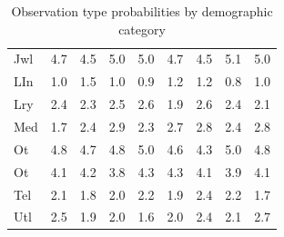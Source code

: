 \documentclass[12pt]{article}
\begin{document}
\begin{table}[!ht]
{\begin{tabular}{lllllllll}
        Jwl & 4.7 & 4.5 & 5.0 & 5.0 & 4.7 & 4.5 & 5.1 & 5.0\\
        LIn & 1.0 & 1.5 & 1.0 & 0.9 & 1.2 & 1.2 & 0.8 & 1.0\\
        Lry & 2.4 & 2.3 & 2.5 & 2.6 & 1.9 & 2.6 & 2.4 & 2.1\\
        Med & 1.7 & 2.4 & 2.9 & 2.3 & 2.7 & 2.8 & 2.4 & 2.8\\
        Ot  & 4.8 & 4.7 & 4.8 & 5.0 & 4.6 & 4.3 & 5.0 & 4.8\\
        Ot  & 4.1 & 4.2 & 3.8 & 4.3 & 4.3 & 4.1 & 3.9 & 4.1\\
        Tel & 2.1 & 1.8 & 2.0 & 2.2 & 1.9 & 2.4 & 2.2 & 1.7\\
        Utl & 2.5 & 1.9 & 2.0 & 1.6 & 2.0 & 2.4 & 2.1 & 2.7\\
        \hline
    \end{tabular}
    }%
    \caption{Observation type probabilities by demographic category}
    \label{tab:dem_vin}
\end{table}

\end{document}
